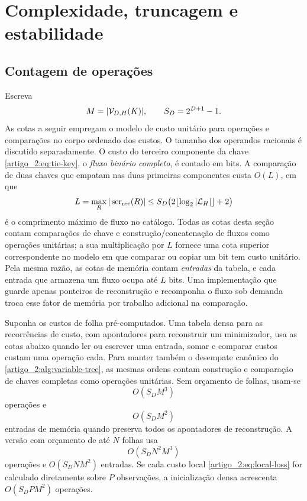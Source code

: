 \section{Complexidade, truncagem e estabilidade}
\label{artigo_2:sec:complexity-dp}

\subsection{Contagem de operações}

Escreva
\[
 M=|\mathcal{V}_{D,H}(K)|,\qquad S_D=2^{D+1}-1.
\]
As cotas a seguir empregam o modelo de custo unitário para operações e comparações
no corpo ordenado dos custos. O tamanho dos operandos racionais é discutido
separadamente. O custo do terceiro componente da chave \eqref{artigo_2:eq:tie-key}, o
\emph{fluxo binário completo}, é contado em bits. A comparação de duas
chaves que empatam nas duas primeiras componentes custa
$O(L)$, em que
\begin{equation}
 L=\max_R|\operatorname{ser}_{\rm rec}(R)|
 \le S_D\bigl(2\lfloor\log_2|\mathcal{L}_H|\rfloor+2\bigr)
 \label{artigo_2:eq:stream-length}
\end{equation}
é o comprimento máximo de fluxo no catálogo. Todas as cotas desta seção contam
comparações de chave e construção/concatenação de fluxos como operações unitárias;
a sua multiplicação por $L$ fornece uma cota superior correspondente no modelo em que
comparar ou copiar um bit tem custo unitário.
Pela mesma razão, as cotas de memória contam \emph{entradas} da tabela, e cada
entrada que armazena um fluxo ocupa até $L$ bits. Uma implementação que
guarde apenas ponteiros de reconstrução e recomponha o fluxo sob demanda
troca esse fator de memória por trabalho adicional na comparação.

\begin{theorem}\label{map:artigo_2:9.1}
\label{artigo_2:thm:state-complexity}
Suponha os custos de folha pré-computados. Uma tabela densa para as
recorrências de custo, com apontadores para reconstruir um minimizador,
usa as cotas abaixo quando ler ou escrever uma entrada, somar e comparar
custos custam uma operação cada. Para manter também o desempate canônico do
\cref{artigo_2:alg:variable-tree}, as mesmas ordens contam construção e
comparação de chaves completas como operações unitárias. Sem orçamento de folhas, usam-se
\begin{equation}
 O(S_DM^3)
 \label{artigo_2:eq:dense-time}
\end{equation}
operações e
\begin{equation}
 O(S_DM^2)
 \label{artigo_2:eq:dense-memory}
\end{equation}
entradas de memória quando preserva todos os apontadores de reconstrução.
A versão com orçamento de até $N$ folhas usa
\begin{equation}
 O(S_DN^2M^3)
 \label{artigo_2:eq:budget-time}
\end{equation}
operações e $O(S_DNM^2)$ entradas. Se cada custo local
\eqref{artigo_2:eq:local-loss} for calculado diretamente sobre $P$ observações, a
inicialização densa acrescenta $O(S_DPM^2)$ operações.
\end{theorem}

